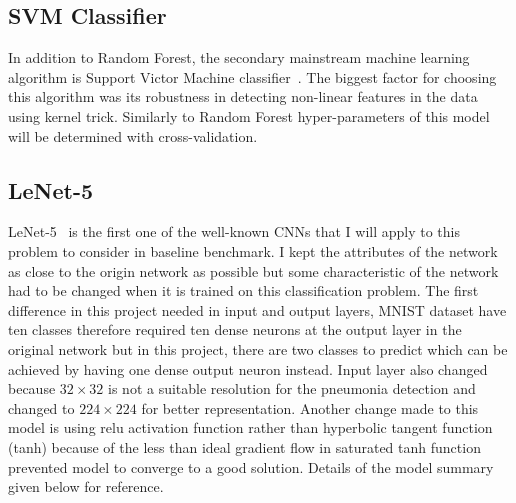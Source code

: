 \subsection{SVM Classifier}
In addition to Random Forest, the secondary mainstream machine learning algorithm is Support Victor Machine classifier~\cite{svm}.
The biggest factor for choosing this algorithm was its robustness in detecting non-linear features in the data using kernel trick.
Similarly to Random Forest hyper-parameters of this model will be determined with cross-validation.

\subsection{LeNet-5}
LeNet-5~\cite{Lenet5} is the first one of the well-known CNNs that I will apply to this problem to consider in baseline benchmark.
I kept the attributes of the network as close to the origin network as possible but some characteristic of the network had to be changed when it is trained on this classification problem.
The first difference in this project needed in input and output layers, MNIST dataset have ten classes therefore required ten dense neurons at the output layer in the original network but in this project, there are two classes to predict which can be achieved by having one dense output neuron instead.
Input layer also changed because $32 \times 32$ is not a suitable resolution for the pneumonia detection and changed to $224 \times 224$ for better representation.
Another change made to this model is using relu activation function rather than hyperbolic tangent function (tanh) because of the less than ideal gradient flow in saturated tanh function prevented model to converge to a good solution.
Details of the model summary given below for reference.

